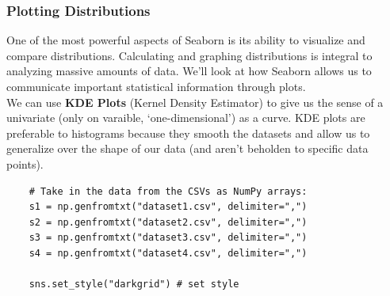 \documentclass[11pt, a4paper]{article}
\begin{document}
\begin{spacing}{1.1}
	\subsubsection{Plotting Distributions}
	One of the most powerful aspects of Seaborn is its ability to visualize and compare distributions. Calculating and graphing distributions is integral to analyzing massive amounts of data. We’ll look at how Seaborn allows us to communicate important statistical information through plots. \vspace*{2mm} \\
	We can use \textbf{KDE Plots} (Kernel Density Estimator) to give us the sense of a univariate (only on varaible, `one-dimensional') as a curve. KDE plots are preferable to histograms because they smooth the datasets and allow us to generalize over the shape of our data (and aren't beholden to specific data points).
	\begin{minipage}[c]{10.3cm}
	\begin{lstlisting}
	# Take in the data from the CSVs as NumPy arrays:
	s1 = np.genfromtxt("dataset1.csv", delimiter=",")
	s2 = np.genfromtxt("dataset2.csv", delimiter=",")
	s3 = np.genfromtxt("dataset3.csv", delimiter=",")
	s4 = np.genfromtxt("dataset4.csv", delimiter=",")
	
	sns.set_style("darkgrid") # set style
	

\end{lstlisting}
\end{minipage}
\end{spacing}
\end{document}
